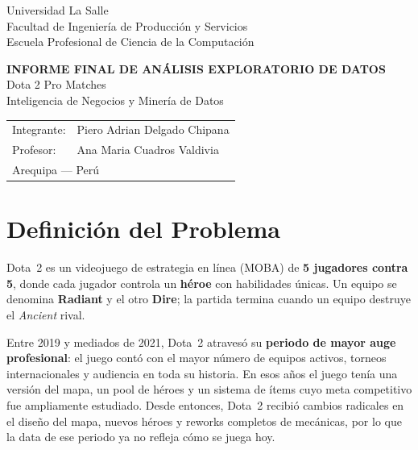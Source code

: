 \documentclass[12pt,a4paper]{article}
\begin{document}
\begin{titlepage}
  \thispagestyle{empty}
  \begin{flushleft}
    Universidad La Salle\\
    Facultad de Ingenier\'ia de Producci\'on y Servicios\\
    Escuela Profesional de Ciencia de la Computaci\'on
  \end{flushleft}
  \vspace*{\fill}
  \begin{center}
    {\Large\bfseries INFORME FINAL DE AN\'ALISIS EXPLORATORIO DE DATOS}\\[1.2em]
    {\Large Dota 2 Pro Matches}\\[1.5em]
    {\normalsize Inteligencia de Negocios y Miner\'ia de Datos}
  \end{center}
  \vspace*{\fill}
  \begin{flushright}
    \begin{tabular}{ll}
      Integrante: & Piero Adrian Delgado Chipana \\[0.4em]
      Profesor:   & Ana Maria Cuadros Valdivia   \\[0.4em]
      \multicolumn{2}{l}{Arequipa --- Per\'u}
    \end{tabular}
  \end{flushright}
\end{titlepage}

\thispagestyle{fancy}
\renewcommand{\contentsname}{\'Indice de Contenidos}
\tableofcontents
\newpage

\section{Definici\'on del Problema}

Dota~2 es un videojuego de estrategia en l\'inea (MOBA) de \textbf{5 jugadores
contra 5}, donde cada jugador controla un \textbf{h\'eroe} con habilidades
\'unicas. Un equipo se denomina \textbf{Radiant} y el otro \textbf{Dire}; la
partida termina cuando un equipo destruye el \textit{Ancient} rival.

Entre 2019 y mediados de 2021, Dota~2 atraves\'o su \textbf{periodo de mayor
auge profesional}: el juego cont\'o con el mayor n\'umero de equipos activos,
torneos internacionales y audiencia en toda su historia. En esos a\~nos el
juego ten\'ia una versi\'on del mapa, un pool de h\'eroes y un sistema de \'items
cuyo meta competitivo fue ampliamente estudiado. Desde entonces, Dota~2 recibi\'o
cambios radicales en el dise\~no del mapa, nuevos h\'eroes y reworks completos de
mec\'anicas, por lo que la data de ese periodo ya no refleja c\'omo se juega hoy.
\end{document}

